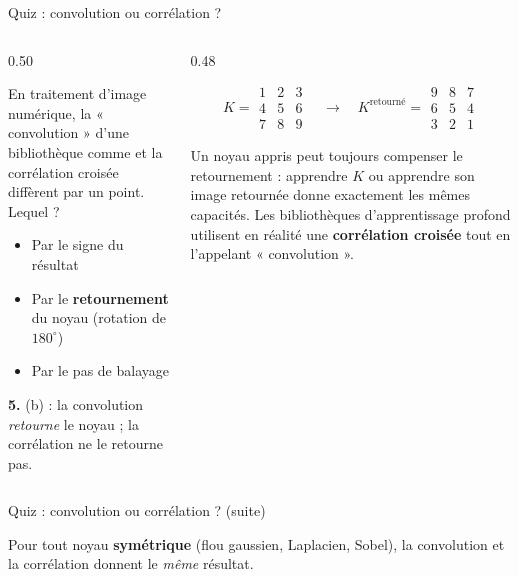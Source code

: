 \begin{frame}{Quiz : convolution ou corrélation ?}
\begin{columns}[t]
\begin{column}{0.50\textwidth}
\begin{qbox}
En traitement d'image numérique, la « convolution » d'une bibliothèque
comme  et la corrélation croisée diffèrent par
un point. Lequel ?
\begin{itemize}
  \item[(a)] Par le signe du résultat
  \item[(b)] Par le \textbf{retournement} du noyau (rotation de $180^\circ$)
  \item[(c)] Par le pas de balayage
\end{itemize}
\end{qbox}
\begin{solbox}[Réponse]
\textbf{5.} (b) : la convolution \emph{retourne} le noyau ; la corrélation
ne le retourne pas.
\end{solbox}
\end{column}
\begin{column}{0.48\textwidth}
\begin{ebox}
\[
K = \begin{smallmatrix}1&2&3\\4&5&6\\7&8&9\end{smallmatrix}
\quad \longrightarrow \quad
K^{\text{retourné}} = \begin{smallmatrix}9&8&7\\6&5&4\\3&2&1\end{smallmatrix}
\]
\end{ebox}
\begin{kbox}
Un noyau appris peut toujours compenser le retournement : apprendre
$K$ ou apprendre son image retournée donne exactement les mêmes capacités.
Les bibliothèques d'apprentissage profond utilisent en réalité une
\textbf{corrélation croisée} tout en l'appelant « convolution ».
\end{kbox}

\end{column}
\end{columns}
\end{frame}
\begin{frame}{Quiz : convolution ou corrélation ? (suite)}
\begin{wbox}
Pour tout noyau \textbf{symétrique} (flou gaussien, Laplacien, Sobel), la
convolution et la corrélation donnent le \emph{même} résultat.
\end{wbox}
\end{frame}

